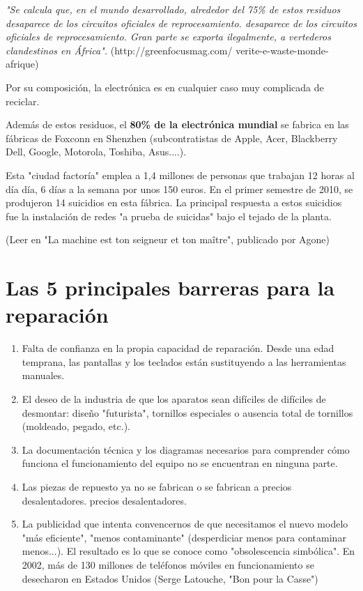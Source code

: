 \documentclass[a5paper,twoside,openany]{book}
\begin{document}
\textit{"Se calcula que, en el mundo desarrollado, alrededor del 75\% de estos residuos desaparece de los circuitos oficiales de reprocesamiento.
desaparece de los circuitos oficiales de reprocesamiento. Gran parte se exporta
ilegalmente, a vertederos clandestinos en África".
}
(http://greenfocusmag.com/ verite-e-waste-monde-afrique)

Por su composición, la electrónica es en cualquier caso muy complicada de reciclar.

Además de estos residuos, el \textbf{80\% de la electrónica mundial} se fabrica
en las fábricas de Foxconn en Shenzhen (subcontratistas de Apple, Acer, Blackberry
Dell, Google, Motorola, Toshiba, Asus....).

Esta "ciudad factoría" emplea a 1,4 millones de personas que trabajan 12 horas al día
día, 6 días a la semana por unos 150 euros.
En el primer semestre de 2010, se produjeron 14 suicidios en esta
fábrica. La principal respuesta a estos suicidios fue la instalación de redes "a prueba de suicidas" bajo el tejado de la planta.

(Leer en "La machine est ton seigneur et ton maître", publicado por Agone)

\section{Las 5 principales barreras para la reparación}
\begin{enumerate}
\item Falta de confianza en la propia capacidad de reparación.
Desde una edad temprana, las pantallas y los teclados están sustituyendo a las herramientas manuales.
\item El deseo de la industria de que los aparatos sean difíciles de
difíciles de desmontar: diseño "futurista", tornillos especiales o ausencia total de tornillos (moldeado, pegado, etc.).
\item La documentación técnica y los diagramas necesarios para comprender cómo funciona el
funcionamiento del equipo no se encuentran en ninguna parte.
\item Las piezas de repuesto ya no se fabrican o se fabrican a precios desalentadores.
precios desalentadores.
\item La publicidad que intenta convencernos de que necesitamos el nuevo modelo "más eficiente", "menos contaminante" (desperdiciar menos para contaminar menos...).
El resultado es lo que se conoce como "obsolescencia simbólica".
En 2002, más de 130 millones de teléfonos móviles en funcionamiento
se desecharon en Estados Unidos (Serge Latouche, "Bon pour la
Casse")
\end{enumerate}
\end{document}
